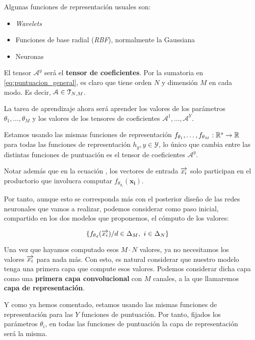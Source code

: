 Algunas funciones de representación usuales son:

\begin{itemize}
    \item \textit{Wavelets}
    \item Funciones de base radial (\textit{RBF}), normalmente la Gaussiana
    \item Neuronas
\end{itemize}

El tensor $\mathcal{A}^y$ será el \textbf{tensor de coeficientes}. Por la sumatoria en \eqref{eq:puntuacion_general}, es claro que tiene orden $N$ y dimensión $M$ en cada modo. Es decir, $\mathcal{A} \in \mathcal{T}_{N, M}$.

La tarea de aprendizaje ahora será aprender los valores de los parámetros $\theta_1, \ldots, \theta_M$ y los valores de los tensores de coeficientes $\mathcal{A}^1, \ldots, \mathcal{A}^Y$.

\begin{observacion}

    Estamos usando las mismas funciones de representación $f_{\theta_1}, \ldots, f_{\theta_M}: \mathbb{R}^s \to \mathbb{R}$ para todas las funciones de representación $h_y, y \in \mathcal{Y}$, lo único que cambia entre las distintas funciones de puntuación es el tensor de coeficientes $\mathcal{A}^y$.


    Notar además que en la ecuación , los vectores de entrada $\overrightarrow{x_i}$ solo participan en el productorio que involucra computar $f_{\theta_{d_i}}(\mathbf{x_i})$.

    Por tanto, aunque esto se corresponda más con el posterior diseño de las redes neuronales que vamos a realizar, podemos considerar como paso inicial, compartido en los dos modelos que proponemos, el cómputo de los valores:

    $$\{f_{\theta_d}(\overrightarrow{x_i}) / d \in \Delta_{M},\ i \in \Delta_{N} \}$$

    Una vez que hayamos computado esos $M \cdot N$ valores, ya no necesitamos los valores $\overrightarrow{x_i}$ para nada más. Con esto, es natural considerar que nuestro modelo tenga una primera capa que compute esos valores. Podemos considerar dicha capa como una \textbf{primera capa convolucional} con $M$ canales, a la que llamaremos \textbf{capa de representación}.

    Y como ya hemos comentado, estamos usando las mismas funciones de representación para las $Y$ funciones de puntuación. Por tanto, fijados los parámetros $\theta_i$, en todas las funciones de puntuación la capa de representación será la misma.
\end{observacion}

